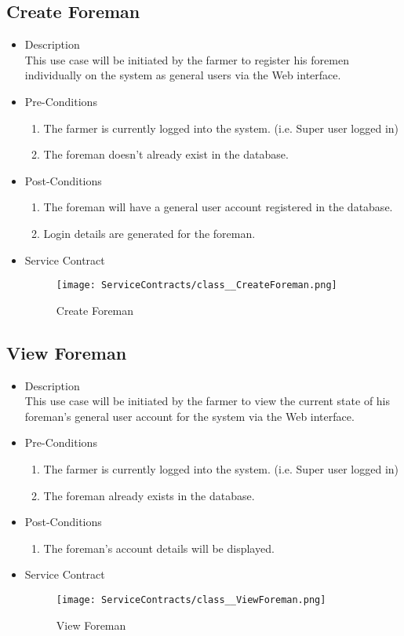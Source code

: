 \documentclass[11pt,fleqn]{book} %
\begin{document}
\subsection{Create Foreman}
\begin{itemize}
	\item Description\\
	This use case will be initiated by the farmer to register his foremen individually on the system as general users via the Web interface.
	\item Pre-Conditions
	\begin{enumerate}
		\item The farmer is currently logged into the system. (i.e. Super user logged in)
		\item The foreman doesn’t already exist in the database.
	\end{enumerate}
	\item Post-Conditions
	\begin{enumerate}
		\item The foreman will have a general user account registered in the database.
		\item Login details are generated for the foreman.				
	\end{enumerate}
	\item Service Contract
	\begin{figure}
		\texttt{[image: ServiceContracts/class\_\_CreateForeman.png]}
		\caption{Create Foreman}
	\end{figure}
\end{itemize}

\subsection{View Foreman}
\begin{itemize}
	\item Description\\
	This use case will be initiated by the farmer to view the current state of his foreman’s general user account for the system via the Web interface.
	\item Pre-Conditions
	\begin{enumerate}
		\item The farmer is currently logged into the system. (i.e. Super user logged in)
		\item The foreman already exists in the database.					
	\end{enumerate}
	\item Post-Conditions
	\begin{enumerate}
		\item The foreman’s account details will be displayed.
	\end{enumerate}
	\item Service Contract
	\begin{figure}
		\texttt{[image: ServiceContracts/class\_\_ViewForeman.png]}
		\caption{View Foreman}
	\end{figure}
\end{itemize}
\end{document}
